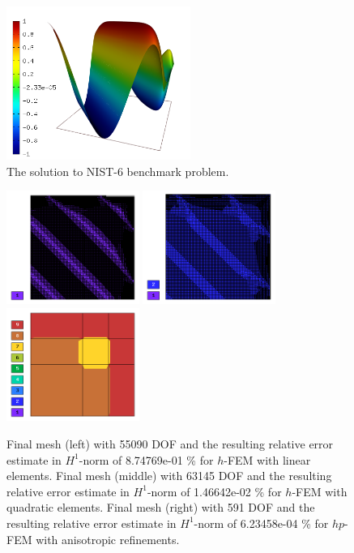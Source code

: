 \documentclass[12pt]{elsarticle}
\begin{document}
\begin{figure}[H]
\centering
\vspace{-3mm}
\includegraphics[height=5cm]{nist/nist-6/solution.png}
\caption{The solution to NIST-6 benchmark problem.}
\vspace{-3mm}
\label{fig:sln-nist06}
\end{figure}

\begin{figure}[H]
\centering
\includegraphics[height=3.7cm]{nist/nist-6/mesh_h1_aniso.png}
\includegraphics[height=3.7cm]{nist/nist-6/mesh_h2_aniso.png}
\includegraphics[height=3.7cm]{nist/nist-6/mesh_hp_aniso.png}
\vspace{-3mm}
\caption{
Final mesh (left) with 55090 DOF and the resulting
relative error estimate in $H^1$-norm of 8.74769e-01 \% for $h$-FEM with linear elements.
Final mesh (middle) with 63145 DOF and the resulting
relative error estimate in $H^1$-norm of 1.46642e-02 \% for $h$-FEM with quadratic elements.
Final mesh (right) with 591 DOF and the resulting
relative error estimate in $H^1$-norm of 6.23458e-04 \% for $hp$-FEM with anisotropic refinements.}
\vspace{-2mm}
\label{fig:nist-6-hp-aniso}
\end{figure}
\end{document}
